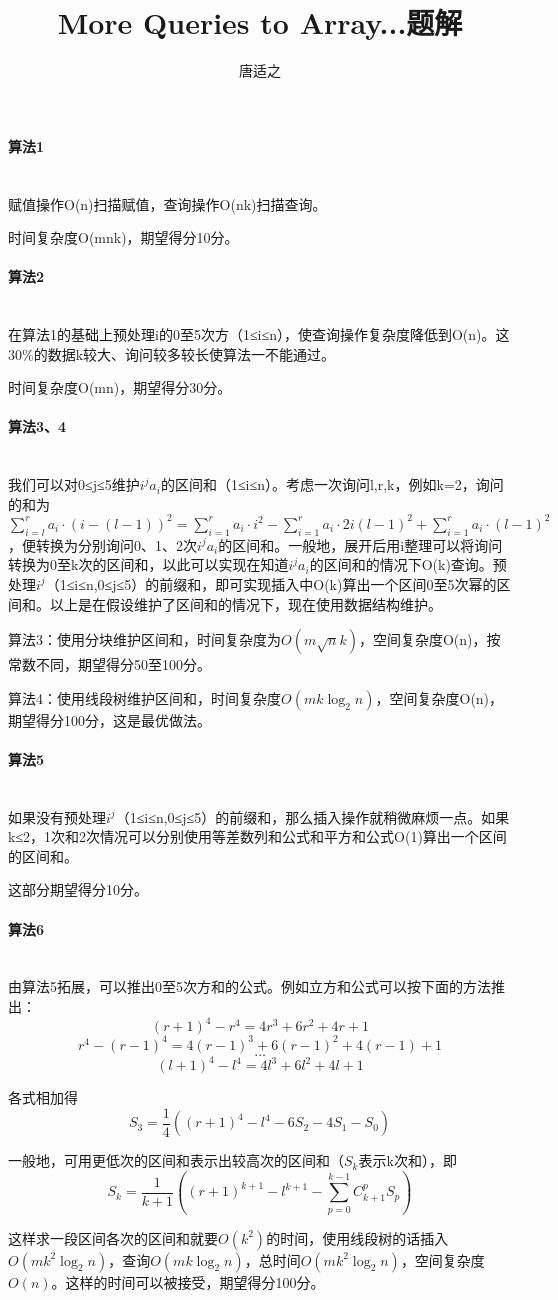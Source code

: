 \documentclass[UTF8]{ctexart}
\title{More Queries to Array...题解}
\author{唐适之}
\date{}
\newcommand{\myparagraph}[1]{\paragraph{#1}\mbox{}\\}
\begin{document}
\maketitle

\myparagraph{算法1}

赋值操作O(n)扫描赋值，查询操作O(nk)扫描查询。

时间复杂度O(mnk)，期望得分10分。

\myparagraph{算法2}

在算法1的基础上预处理i的0至5次方（1≤i≤n），使查询操作复杂度降低到O(n)。这30\%的数据k较大、询问较多较长使算法一不能通过。

时间复杂度O(mn)，期望得分30分。

\myparagraph{算法3、4}

我们可以对0≤j≤5维护$i^j a_i$的区间和（1≤i≤n）。考虑一次询问l,r,k，例如k=2，询问的和为$\sum_{i=l}^r  a_i \cdot (i-(l-1))^2 = \sum_{i=1}^r  a_i \cdot i^2 - \sum_{i=1}^r  a_i \cdot 2i(l-1)^2 + \sum_{i=1}^r  a_i \cdot (l-1)^2$，便转换为分别询问0、1、2次$i^j a_i$的区间和。一般地，展开后用i整理可以将询问转换为0至k次的区间和，以此可以实现在知道$i^j a_i$的区间和的情况下O(k)查询。预处理$i^j$（1≤i≤n,0≤j≤5）的前缀和，即可实现插入中O(k)算出一个区间0至5次幂的区间和。以上是在假设维护了区间和的情况下，现在使用数据结构维护。

算法3：使用分块维护区间和，时间复杂度为$O(m\sqrt{n}k)$，空间复杂度O(n)，按常数不同，期望得分50至100分。

算法4：使用线段树维护区间和，时间复杂度$O(mk\log_2{n})$，空间复杂度O(n)，期望得分100分，这是最优做法。

\myparagraph{算法5}

如果没有预处理$i^j$（1≤i≤n,0≤j≤5）的前缀和，那么插入操作就稍微麻烦一点。如果k≤2，1次和2次情况可以分别使用等差数列和公式和平方和公式O(1)算出一个区间的区间和。

这部分期望得分10分。

\myparagraph{算法6}

由算法5拓展，可以推出0至5次方和的公式。例如立方和公式可以按下面的方法推出：
$$(r+1)^4-r^4=4r^3+6r^2+4r+1$$
$$r^4-(r-1)^4=4(r-1)^3+6(r-1)^2+4(r-1)+1$$
$$\dots$$
$$(l+1)^4-l^4=4l^3+6l^2+4l+1$$

各式相加得
$$S_3=\frac{1}{4} ((r+1)^4-l^4-6S_2-4S_1-S_0)$$

一般地，可用更低次的区间和表示出较高次的区间和（$S_k$表示k次和），即
$$S_k=\frac{1}{k+1} ((r+1)^{k+1}-l^{k+1}-\sum_{p=0}^{k-1} C_{k+1}^p S_p)$$

这样求一段区间各次的区间和就要$O(k^2)$的时间，使用线段树的话插入$O(mk^2\log_2{n})$，查询$O(mk\log_2{n})$，总时间$O(mk^2\log_2{n})$，空间复杂度$O(n)$。这样的时间可以被接受，期望得分100分。
\end{document}

